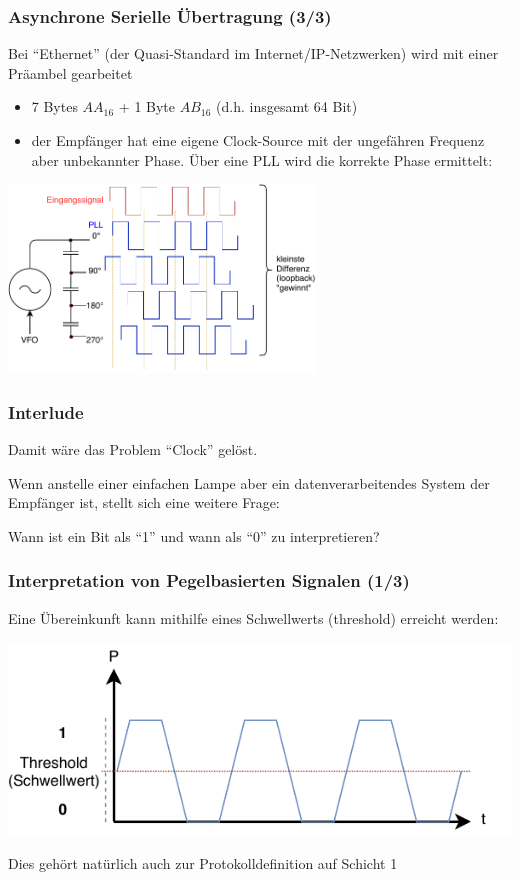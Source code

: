 \documentclass[ignorenonframetext]{beamer}
\begin{document}
\begin{frame}
\frametitle{Asynchrone Serielle \"Ubertragung (3/3)}
Bei ``Ethernet'' (der Quasi-Standard im Internet/IP-Netzwerken) wird mit einer Pr\"aambel gearbeitet
\begin{itemize}
\item 7 Bytes $AA_{16}$ + 1 Byte $AB_{16}$ {} (d.h. insgesamt 64 Bit)
\item der Empf\"anger hat eine eigene Clock-Source mit der ungef\"ahren Frequenz aber unbekannter Phase. \"Uber eine PLL wird die korrekte Phase ermittelt:
\end{itemize}
\includegraphics[height=5cm]{asynchron-ethernet}
\end{frame}


\begin{frame}
\frametitle{Interlude}
Damit w\"are das Problem ``Clock'' gel\"ost.

Wenn anstelle einer einfachen Lampe aber ein datenverarbeitendes System der
Empf\"anger ist, stellt sich eine weitere Frage:

\begin{block}{}
Wann ist ein Bit als ``1'' und wann als ``0'' zu interpretieren?
\end{block}
\end{frame}







\begin{frame}
\frametitle{Interpretation von Pegelbasierten Signalen (1/3)}
Eine \"Ubereinkunft kann mithilfe eines Schwellwerts (threshold) erreicht werden:

\includegraphics{threshold}

Dies geh\"ort nat\"urlich auch zur Protokolldefinition auf Schicht 1
\end{frame}
\end{document}
